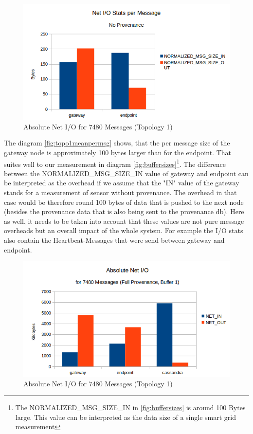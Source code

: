 \begin{figure}[H]
	\center
	\includegraphics[width=\textwidth]{figures/overheaddiagram7.png}
	\caption{Absolute Net I/O for 7480 Messages (Topology 1)}
	\label{fig:topo1absolutenoprov}
\end{figure}

The diagram \ref{fig:topo1meanpermsg} shows, that the per message size of the gateway node is approximately 100 bytes larger than for the endpoint. That suites well to our measurement in diagram \ref{fig:buffersizes}\footnote{The NORMALIZED\_MSG\_SIZE\_IN in \ref{fig:buffersizes} is around 100 Bytes large. This value can be interpreted as the data size of a single smart grid measurement}. The difference between the NORMALIZED\_MSG\_SIZE\_IN value of gateway and endpoint can be interpreted as the overhead if we assume that the "IN" value of the gateway stands for a measurement of sensor without provenance. The overhead in that case would be therefore round 100 bytes of data that is pushed to the next node (besides the provenance data that is also being sent to the provenance db). Here as well, it needs to be taken into account that these values are not pure message overheads but an overall impact of the whole system. For example the I/O stats also contain the Heartbeat-Messages that were send between gateway and endpoint.


\begin{figure}[H]
	\center
	\includegraphics[width=\textwidth]{figures/overheaddiagram4.png}
	\caption{Absolute Net I/O for 7480 Messages (Topology 1)}
	\label{fig:topo1absoluteprov}
\end{figure}


